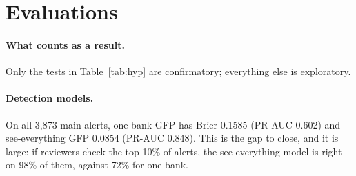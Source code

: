\documentclass[11pt,a4paper]{article}
\begin{document}
\section{Evaluations}

\begin{table}[t]
\centering\small
{}
\caption{Hypotheses fixed in advance, on the test split (771 askable alerts; H9's interval is for the difference in gap closed). H5, H6, H8 and H10 were not run in the reduced plan.}
\label{tab:hyp}
\end{table}

\paragraph{What counts as a result.} Only the tests in Table~\ref{tab:hyp} are confirmatory; everything else is exploratory.

\paragraph{Detection models.} On all 3,873 main alerts, one-bank GFP has Brier 0.1585 (PR-AUC 0.602) and see-everything GFP 0.0854 (PR-AUC 0.848). This is the gap to close, and it is large: if reviewers check the top 10\% of alerts, the see-everything model is right on 98\% of them, against 72\% for one bank.
\end{document}
